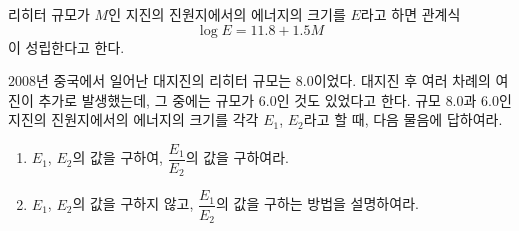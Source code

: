 \documentclass[11pt, a4paper]{book}
\begin{document}
\begin{problem}
	리히터 규모가 $M$인 지진의 진원지에서의 에너지의 크기를 $E$라고 하면 관계식
	\[
		\log E=11.8+1.5M
	\]
	이 성립한다고 한다.
	
	$2008$년 중국에서 일어난 대지진의 리히터 규모는 $8.0$이었다. 대지진 후 여러 차례의 여진이 추가로 발생했는데, 그 중에는 규모가 $6.0$인 것도 있었다고 한다. 규모 $8.0$과 $6.0$인 지진의 진원지에서의 에너지의 크기를 각각 $E_{1}$, $E_{2}$라고 할 때, 다음 물음에 답하여라.
	\begin{enumerate}[label=(\arabic*)]
		\item $E_{1}$, $E_{2}$의 값을 구하여, $\dfrac{E_{1}}{E_{2}}$의 값을 구하여라.
		\item $E_{1}$, $E_{2}$의 값을 구하지 않고, $\dfrac{E_{1}}{E_{2}}$의 값을 구하는 방법을 설명하여라.
	\end{enumerate}
\end{problem}




\end{document}
